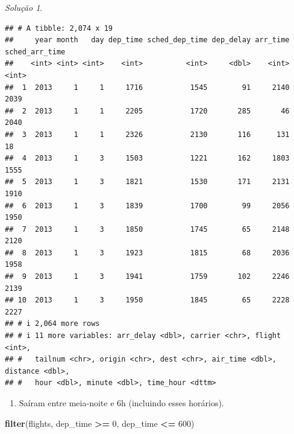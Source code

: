 \documentclass[
]{latex/krantz}
\newenvironment{Shaded}{\begin{snugshade}}{\end{snugshade}}
\newcommand{\DecValTok}[1]{\textcolor[rgb]{0.00,0.00,0.81}{#1}}
\newcommand{\FunctionTok}[1]{\textcolor[rgb]{0.13,0.29,0.53}{\textbf{#1}}}
\newcommand{\NormalTok}[1]{#1}
\newcommand{\SpecialCharTok}[1]{\textcolor[rgb]{0.81,0.36,0.00}{\textbf{#1}}}
\providecommand{\tightlist}{%
  \setlength{\itemsep}{0pt}\setlength{\parskip}{0pt}}
\theoremstyle{definition}
\theoremstyle{definition}
\theoremstyle{definition}
\theoremstyle{definition}
\theoremstyle{remark}
\newtheorem*{solution}{Solução}
\begin{document}
\begin{solution}
\begin{verbatim}
## # A tibble: 2,074 x 19
##     year month   day dep_time sched_dep_time dep_delay arr_time sched_arr_time
##    <int> <int> <int>    <int>          <int>     <dbl>    <int>          <int>
##  1  2013     1     1     1716           1545        91     2140           2039
##  2  2013     1     1     2205           1720       285       46           2040
##  3  2013     1     1     2326           2130       116      131             18
##  4  2013     1     3     1503           1221       162     1803           1555
##  5  2013     1     3     1821           1530       171     2131           1910
##  6  2013     1     3     1839           1700        99     2056           1950
##  7  2013     1     3     1850           1745        65     2148           2120
##  8  2013     1     3     1923           1815        68     2036           1958
##  9  2013     1     3     1941           1759       102     2246           2139
## 10  2013     1     3     1950           1845        65     2228           2227
## # i 2,064 more rows
## # i 11 more variables: arr_delay <dbl>, carrier <chr>, flight <int>,
## #   tailnum <chr>, origin <chr>, dest <chr>, air_time <dbl>, distance <dbl>,
## #   hour <dbl>, minute <dbl>, time_hour <dttm>
\end{verbatim}

\begin{enumerate}
\def\labelenumi{\alph{enumi}.}
\setcounter{enumi}{6}
\tightlist
\item
  Saíram entre meia-noite e 6h (incluindo esses horários).
\end{enumerate}

\begin{Shaded}
\begin{Highlighting}[]
\FunctionTok{filter}\NormalTok{(flights, dep\_time }\SpecialCharTok{\textgreater{}=} \DecValTok{0}\NormalTok{, dep\_time }\SpecialCharTok{\textless{}=} \DecValTok{600}\NormalTok{)}
\end{Highlighting}
\end{Shaded}


\end{solution}
\end{document}

